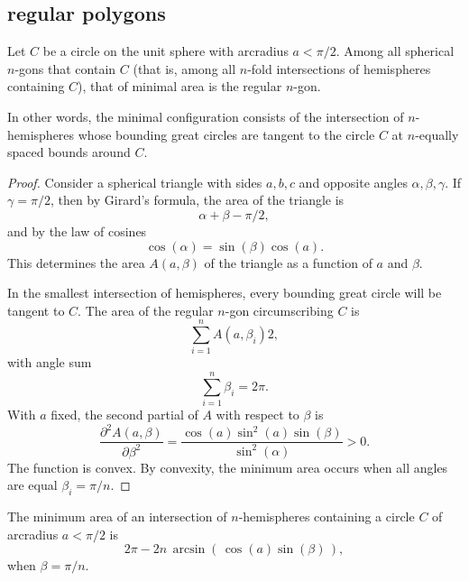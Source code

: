 \subsection{regular polygons}

\begin{lemma}\label{lemma:ngon}
Let $C$ be a circle on the unit sphere with arcradius $a<\pi/2$.  Among all spherical $n$-gons that
contain $C$  (that is, among all $n$-fold intersections of hemispheres containing $C$), that of minimal area is the regular $n$-gon.  
\end{lemma}

In other words, the minimal configuration consists of the intersection of $n$-hemispheres whose bounding great circles are tangent to the circle $C$ at $n$-equally spaced bounds around $C$.

\begin{proof} 
Consider a spherical triangle with sides $a,b,c$ and opposite angles $\alpha,\beta,\gamma$.  If $\gamma=\pi/2$, then by Girard's formula, the area
of the triangle is
$$
\alpha+\beta-\pi/2,
$$
and by the law of cosines 
$$
\cos(\alpha) =\sin(\beta)\cos(a).
$$
This determines the area $A(a,\beta)$ of the triangle 
as a function of $a$ and $\beta$.

In the smallest intersection of hemispheres,  every bounding great circle will be tangent to $C$.
The area of the regular $n$-gon circumscribing $C$ is
$$
\sum_{i=1}^n A(a,\beta_i) 2,
$$
with angle sum
$$
\sum_{i=1}^n \beta_i = 2\pi.
$$
With  $a$ fixed, the second partial of $A$ with respect to $\beta$ is
$$
\frac{\partial^2 A(a,\beta)}{\partial \beta^2} = \frac{\cos(a)\sin^2(a)\sin(\beta)}{\sin^2(\alpha)} > 0.
$$
The function is convex.
By convexity, the minimum area occurs when all angles are equal
$\beta_i = \pi/n$.
\end{proof}

\begin{lemma}\label{lemma:ngon-area}
The minimum area of an intersection of $n$-hemispheres containing a circle $C$ 
of arcradius $a<\pi/2$ is
$$
2\pi - 2 n \,\arcsin\left(\,\cos(a)\sin(\beta)\,\right),
$$
when $\beta = \pi/n$.
\end{lemma}

